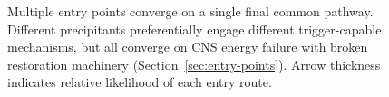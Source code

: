 \begin{figure}[htbp]
\begin{tikzpicture}
\end{tikzpicture}
\caption{Multiple entry points converge on a single final common pathway. Different precipitants preferentially engage different trigger-capable mechanisms, but all converge on CNS energy failure with broken restoration machinery (Section~\ref{sec:entry-points}). Arrow thickness indicates relative likelihood of each entry route.}
\label{fig:entry-points-funnel}
\end{figure}
